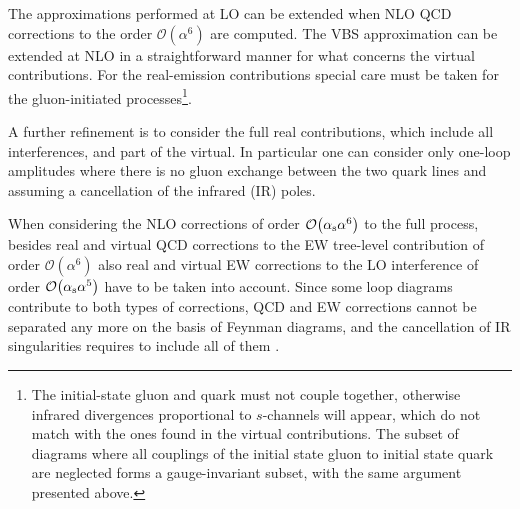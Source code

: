 The approximations performed at LO can be extended when NLO QCD corrections to the order $\mathcal{O}{\left(\alpha^{6}\right)}$ are computed.
The VBS approximation can be extended at NLO in a straightforward manner for what concerns the virtual contributions.
For the real-emission contributions special care must be taken for the gluon-initiated processes\footnote{The initial-state gluon and quark 
    must not couple together, otherwise infrared divergences proportional to $s$-channels will appear, 
     which do not match with the ones found in the virtual contributions.
     The subset of diagrams where all couplings of the initial state gluon to initial state quark are neglected forms a gauge-invariant subset, with the same argument presented above.}.
     \iffalse
This is implemented in the {\sc Powheg-Box}.
This approximation can be used in combination with a double-pole approximation \cite{Dittmaier:2015bfe} for the virtual contribution.
Such an approximation is implemented in {\sc Bonsay}.
In {\sc VBFNLO}, the $s$-channel contributions are available as well and can be
added on top of the VBS approximation. For the real emission diagrams, thereby
as simplification the gluon emission is fully modelled only for initial-state
radiation\AK{I don't understand this sentence. What does 'thereby' refer to?}. The effect of final-state radiation together with the corresponding
virtual contributions is included as a $K$-factor. 
\fi

A further refinement is to consider the full real contributions, which include all interferences, and part of the virtual.
In particular one can consider only one-loop amplitudes where there is no gluon exchange between the two quark lines and 
assuming a cancellation of the infrared (IR) poles.

When considering the NLO corrections of order
$\mathcal{O}{\left(\alpha_{\rm s}\alpha^{6}\right)}$
to the full process, besides real and virtual QCD corrections
to the EW tree-level contribution of order
$\mathcal{O}{\left(\alpha^{6}\right)}$
also real and virtual EW corrections to the LO interference
of order $\mathcal{O}{\left(\alpha_{\rm s}\alpha^{5}\right)}$
have to be taken into account. Since some loop diagrams contribute
to both types of corrections, QCD and EW corrections cannot be
separated any more on the basis of Feynman diagrams, and the
cancellation of IR singularities requires to include all of them \cite{Biedermann:2017bss}.